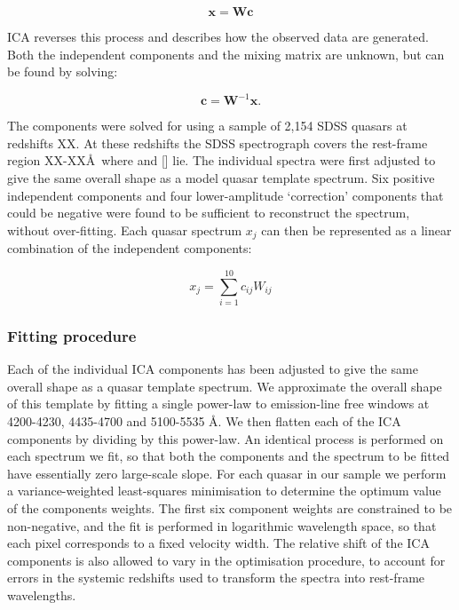 \begin{equation}
    \bm{x} = \bm{W}\bm{c}
\end{equation}

ICA reverses this process and describes how the observed data are generated. 
Both the independent components and the mixing matrix are unknown, but can be found by solving:

\begin{equation}
    \bm{c} = \bm{W}^{-1}\bm{x}.
\end{equation}

The components were solved for using a sample of 2,154 SDSS quasars at redshifts XX. 
At these redshifts the SDSS spectrograph covers the rest-frame region XX-XX\AA\, where \hb and [] lie. 
The individual spectra were first adjusted to give the same overall shape as a model quasar template spectrum.
Six positive independent components and four lower-amplitude `correction' components that could be negative were found to be sufficient to reconstruct the spectrum, without over-fitting. 
Each quasar spectrum $x_j$ can then be represented as a linear combination of the independent components: 

\begin{equation}
    x_j = \sum_{i=1}^{10} c_{ij}W_{ij}
\end{equation}

\subsubsection{Fitting procedure}

Each of the individual ICA components has been adjusted to give the same overall shape as a quasar template spectrum. 
We approximate the overall shape of this template by fitting a single power-law to emission-line free windows at 4200-4230, 4435-4700 and 5100-5535 \AA. 
We then flatten each of the ICA components by dividing by this power-law. 
An identical process is performed on each spectrum we fit, so that both the components and the spectrum to be fitted have essentially zero large-scale slope. 
For each quasar in our sample we perform a variance-weighted least-squares minimisation to determine the optimum value of the components weights.
The first six component weights are constrained to be non-negative, and the fit is performed in logarithmic wavelength space, so that each pixel corresponds to a fixed velocity width.   
The relative shift of the ICA components is also allowed to vary in the optimisation procedure, to account for errors in the systemic redshifts used to transform the spectra into rest-frame wavelengths. 

